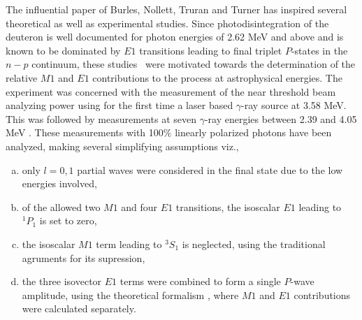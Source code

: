 The influential paper of Burles, Nollett, Truran and Turner \cite{chap34-key17} has inspired several theoretical \cite{chap34-key42,chap34-key43} as well as experimental \cite{chap34-key45,chap34-key46,chap34-key47,chap34-key48} studies. Since photodisintegration of the deuteron is well documented \cite{chap34-key28} for photon energies of 2.62 MeV and above and is known to be dominated by $E1$ transitions leading to final triplet  $P$-states in the $n-p$ continuum, these studies~\cite{chap34-key42,chap34-key43,chap34-key44,chap34-key45,chap34-key46} were  motivated towards the determination of the relative $M1$ and $E1$ contributions to the process at astrophysical energies. The experiment \cite{chap34-key45} was concerned with the measurement of the near threshold beam analyzing power using for the first time a laser based $\gamma$-ray source at 3.58 MeV. This was followed by measurements at seven $\gamma$-ray energies between 2.39 and 4.05 MeV \cite{chap34-key46}. These measurements with 100$\%$ linearly polarized photons have been analyzed, making several  simplifying assumptions viz., 
\begin{enumerate}[a)]
\item only $l=0,1$ partial waves were considered in the final state  due to the low energies involved,
\item of the allowed two $M1$ and four $E1$ transitions, the isoscalar $E1$ leading to $^1P_1$ is set to zero,
\item the isoscalar $M1$ term leading to $^3S_1$ is neglected, using the traditional agruments for its supression,
\item the three isovector $E1$ terms were combined to form a single $P$-wave amplitude, using the theoretical formalism \cite{chap34-key49}, where $M1$ and $E1$ contributions were calculated separately.
\end{enumerate}

